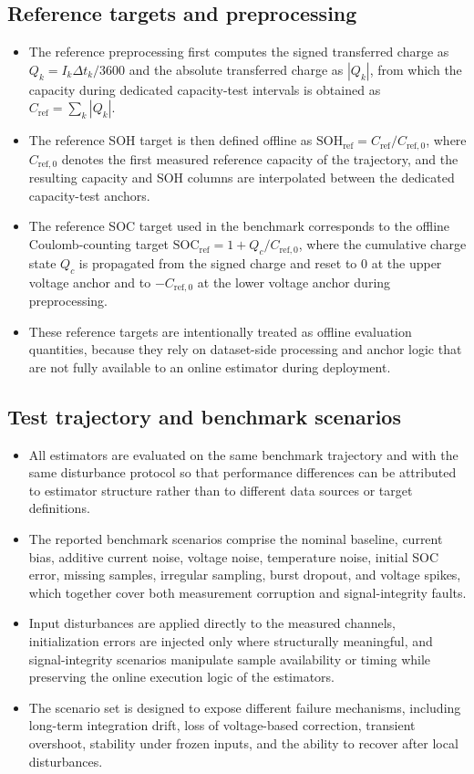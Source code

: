 \documentclass[review]{elsarticle}
\begin{document}
\subsection{Reference targets and preprocessing}
\begin{itemize}[leftmargin=*]
    \item The reference preprocessing first computes the signed transferred charge as $Q_k = I_k \Delta t_k / 3600$ and the absolute transferred charge as $|Q_k|$, from which the capacity during dedicated capacity-test intervals is obtained as $C_{\mathrm{ref}} = \sum_k |Q_k|$.
    \item The reference SOH target is then defined offline as $\mathrm{SOH}_{\mathrm{ref}} = C_{\mathrm{ref}} / C_{\mathrm{ref},0}$, where $C_{\mathrm{ref},0}$ denotes the first measured reference capacity of the trajectory, and the resulting capacity and SOH columns are interpolated between the dedicated capacity-test anchors.
    \item The reference SOC target used in the benchmark corresponds to the offline Coulomb-counting target $\mathrm{SOC}_{\mathrm{ref}} = 1 + Q_c / C_{\mathrm{ref},0}$, where the cumulative charge state $Q_c$ is propagated from the signed charge and reset to $0$ at the upper voltage anchor and to $-C_{\mathrm{ref},0}$ at the lower voltage anchor during preprocessing.
    \item These reference targets are intentionally treated as offline evaluation quantities, because they rely on dataset-side processing and anchor logic that are not fully available to an online estimator during deployment.
\end{itemize}

\subsection{Test trajectory and benchmark scenarios}
\begin{itemize}[leftmargin=*]
    \item All estimators are evaluated on the same benchmark trajectory and with the same disturbance protocol so that performance differences can be attributed to estimator structure rather than to different data sources or target definitions.
    \item The reported benchmark scenarios comprise the nominal baseline, current bias, additive current noise, voltage noise, temperature noise, initial SOC error, missing samples, irregular sampling, burst dropout, and voltage spikes, which together cover both measurement corruption and signal-integrity faults.
    \item Input disturbances are applied directly to the measured channels, initialization errors are injected only where structurally meaningful, and signal-integrity scenarios manipulate sample availability or timing while preserving the online execution logic of the estimators.
    \item The scenario set is designed to expose different failure mechanisms, including long-term integration drift, loss of voltage-based correction, transient overshoot, stability under frozen inputs, and the ability to recover after local disturbances.
\end{itemize}
\end{document}

